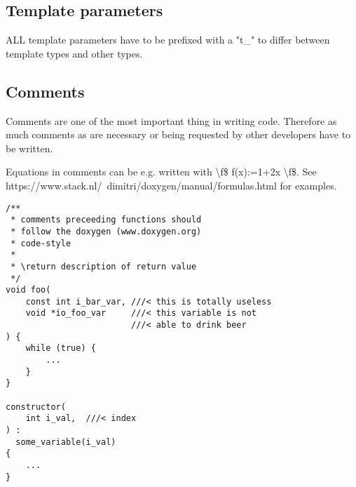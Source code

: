 \documentclass[10pt,a4paper]{article}
\begin{document}
\subsection{Template parameters}
ALL template parameters have to be prefixed with a "t\_" to differ between template types and other types.


\subsection{Comments}
Comments are one of the most important thing in writing code.
Therefore as much comments as are necessary or being requested by other developers have to be written.

Equations in comments can be e.g. written with  {\textbackslash}f\$ f(x):=1+2x {\textbackslash}f\$.
See https://www.stack.nl/~dimitri/doxygen/manual/formulas.html for examples.



\begin{lstlisting}
/**
 * comments preceeding functions should
 * follow the doxygen (www.doxygen.org)
 * code-style
 *
 * \return description of return value 
 */
void foo(
    const int i_bar_var, ///< this is totally useless
    void *io_foo_var     ///< this variable is not
                         ///< able to drink beer
) {
    while (true) {
        ...
    }
}

constructor(
    int i_val,	///< index
) :
  some_variable(i_val)
{
	...
}
\end{lstlisting}
\end{document}
